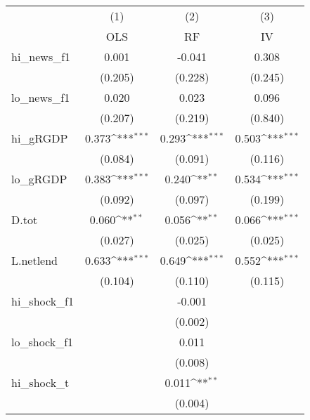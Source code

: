 {
\def\sym#1{\ifmmode^{#1}\else\(^{#1}\)\fi}
\begin{tabular}{l*{3}{c}}
\toprule
            &\multicolumn{1}{c}{(1)}&\multicolumn{1}{c}{(2)}&\multicolumn{1}{c}{(3)}\\
            &\multicolumn{1}{c}{OLS}&\multicolumn{1}{c}{RF}&\multicolumn{1}{c}{IV}\\
\midrule
hi\_news\_f1  &       0.001         &      -0.041         &       0.308         \\
            &     (0.205)         &     (0.228)         &     (0.245)         \\
\addlinespace
lo\_news\_f1  &       0.020         &       0.023         &       0.096         \\
            &     (0.207)         &     (0.219)         &     (0.840)         \\
\addlinespace
hi\_gRGDP    &       0.373\sym{***}&       0.293\sym{***}&       0.503\sym{***}\\
            &     (0.084)         &     (0.091)         &     (0.116)         \\
\addlinespace
lo\_gRGDP    &       0.383\sym{***}&       0.240\sym{**} &       0.534\sym{***}\\
            &     (0.092)         &     (0.097)         &     (0.199)         \\
\addlinespace
D.tot       &       0.060\sym{**} &       0.056\sym{**} &       0.066\sym{***}\\
            &     (0.027)         &     (0.025)         &     (0.025)         \\
\addlinespace
L.netlend   &       0.633\sym{***}&       0.649\sym{***}&       0.552\sym{***}\\
            &     (0.104)         &     (0.110)         &     (0.115)         \\
\addlinespace
hi\_shock\_f1 &                     &      -0.001         &                     \\
            &                     &     (0.002)         &                     \\
\addlinespace
lo\_shock\_f1 &                     &       0.011         &                     \\
            &                     &     (0.008)         &                     \\
\addlinespace
hi\_shock\_t  &                     &       0.011\sym{**} &                     \\
            &                     &     (0.004)         &                     \\

\end{tabular}}
